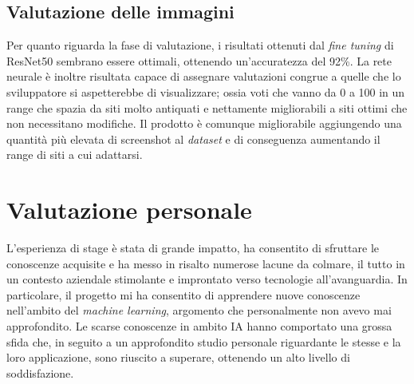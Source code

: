 \subsection{Valutazione delle immagini}
Per quanto riguarda la fase di valutazione, i risultati ottenuti dal \emph{fine tuning} di ResNet50 sembrano essere ottimali, ottenendo un'accuratezza del 92\%.
La rete neurale è inoltre risultata capace di assegnare valutazioni congrue a quelle che lo sviluppatore si aspetterebbe di visualizzare; ossia voti che vanno da 0 a 100 in un range che spazia da siti molto antiquati e nettamente migliorabili a siti ottimi che non necessitano modifiche.
Il prodotto è comunque migliorabile aggiungendo una quantità più elevata di screenshot al \emph{\gls{dataset}} e di conseguenza aumentando il range di siti a cui adattarsi.

\section{Valutazione personale}
L'esperienza di stage è stata di grande impatto, ha consentito di sfruttare le conoscenze acquisite e ha messo in risalto numerose lacune da colmare, il tutto in un contesto aziendale stimolante e improntato verso tecnologie all'avanguardia.
In particolare, il progetto mi ha consentito di apprendere nuove conoscenze nell'ambito del \emph{machine learning}, argomento che personalmente non avevo mai approfondito. 
Le scarse conoscenze in ambito IA hanno comportato una grossa sfida che, in seguito a un approfondito studio personale riguardante le stesse e la loro applicazione, sono riuscito a superare, ottenendo un alto livello di soddisfazione.

